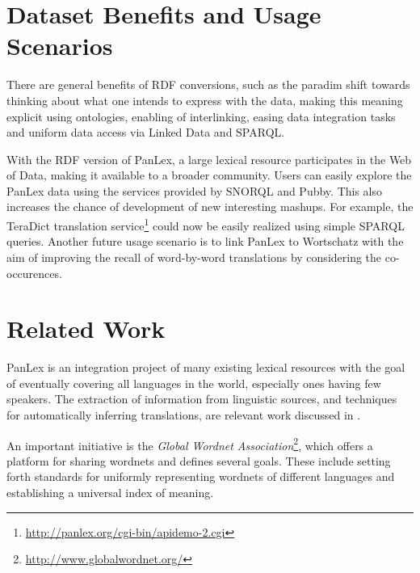 \documentclass[sw]{iosart2c}
\newcommand*{\origtodo}{}
\let\origtodo\todo
\renewcommand*{\todo}{\origtodo[inline]}
\begin{document}
\section{Dataset Benefits and Usage Scenarios}
\label{sec:usage}
There are general benefits of RDF conversions,
such as the paradim shift towards thinking about what one intends to express
with the data, making this meaning explicit using ontologies,
enabling of interlinking, easing data integration tasks and uniform
data access via Linked Data and SPARQL.

With the RDF version of PanLex, a large lexical resource participates in the Web of Data,
making it available to a broader community. Users can easily explore the PanLex data using
the services provided by SNORQL and Pubby. This also increases the chance of development of
new interesting mashups.
For example, the TeraDict translation service\footnote{\url{http://panlex.org/cgi-bin/apidemo-2.cgi}}
could now be easily realized using simple SPARQL queries.
Another future usage scenario is to link PanLex to Wortschatz with the aim of 
improving the recall of word-by-word translations by considering the co-occurences.



\section{Related Work}
\label{sec:related}
PanLex is an integration project of many existing lexical resources with
the goal of eventually covering all languages in the world, especially
ones having few speakers.
The extraction of information from linguistic sources, and
techniques for automatically inferring translations, are
relevant work discussed in \cite{panlex_probtrans}. 

An important initiative is the
\emph{Global Wordnet Association}\footnote{\url{http://www.globalwordnet.org/}},
which offers a platform for sharing wordnets and defines several goals.
These include setting forth standards for uniformly representing wordnets
of different languages and establishing a universal index of meaning.

\end{document}
